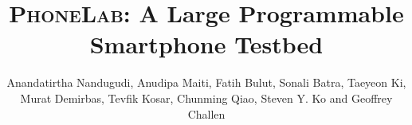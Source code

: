 


\title{\textsc{\LARGE PhoneLab}: A Large Programmable Smartphone Testbed}


\author{
\alignauthor
Anandatirtha Nandugudi, Anudipa Maiti, Fatih Bulut, Sonali Batra, Taeyeon Ki,\\
Murat Demirbas, Tevfik Kosar, Chunming Qiao, Steven Y. Ko and Geoffrey Challen\\[0.06in]
\\
\\[0.06in]
\\
}

\maketitle

\begin{abstract}

\end{abstract}











